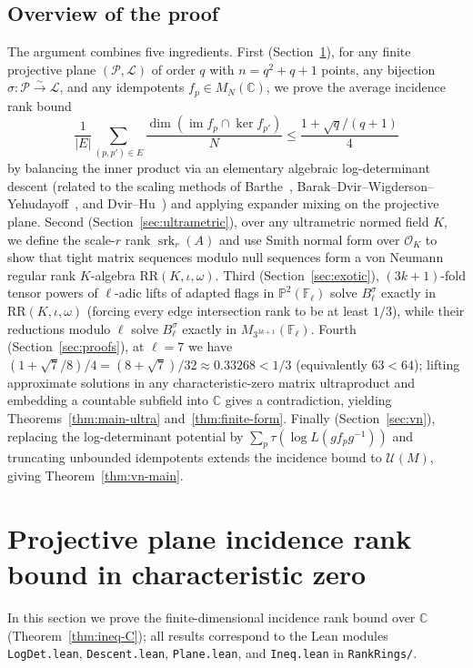 \documentclass[11pt]{article}
\theoremstyle{definition}
\theoremstyle{remark}
\numberwithin{equation}{section}
\DeclareMathOperator{\srk}{srk}
\DeclareMathOperator{\im}{im}
\newcommand{\RR}{\mathrm{RR}}
\newcommand{\C}{\mathbb{C}}
\newcommand{\F}{\mathbb{F}}
\newcommand{\U}{\mathcal{U}}
\newcommand{\PP}{\mathcal{P}}
\newcommand{\LL}{\mathcal{L}}
\newcommand{\OO}{\mathcal{O}}
\newcommand{\1}{\mathbf{1}}
\newcommand{\code}[1]{{\normalfont\small\texttt{#1}}}
\begin{document}
\subsection{Overview of the proof}

The argument combines five ingredients. First (Section~\ref{sec:ineq}), for any finite projective plane $(\PP,\LL)$ of order $q$ with $n = q^2+q+1$ points, any bijection $\sigma\colon \PP \xrightarrow{\sim} \LL$, and any idempotents $f_p \in M_N(\C)$, we prove the average incidence rank bound
\[
\frac{1}{|E|}\sum_{(p,p') \in E} \frac{\dim(\im f_p \cap \ker f_{p'})}{N} \le \frac{1 + \sqrt{q}/(q+1)}{4}
\]
by balancing the inner product via an elementary algebraic log-determinant descent (related to the scaling methods of Barthe~\cite{Barthe1998}, Barak--Dvir--Wigderson--Yehudayoff~\cite{BDWY2011}, and Dvir--Hu~\cite{DvirHu2016}) and applying expander mixing on the projective plane. Second (Section~\ref{sec:ultrametric}), over any ultrametric normed field $K$, we define the scale-$r$ rank $\srk_r(A)$ and use Smith normal form over $\OO_K$ to show that tight matrix sequences modulo null sequences form a von Neumann regular rank $K$-algebra $\RR(K, \iota, \omega)$. Third (Section~\ref{sec:exotic}), $(3k+1)$-fold tensor powers of $\ell$-adic lifts of adapted flags in $\mathbb{P}^2(\F_\ell)$ solve $B_\ell^\sigma$ exactly in $\RR(K, \iota, \omega)$ (forcing every edge intersection rank to be at least $1/3$), while their reductions modulo $\ell$ solve $B_\ell^\sigma$ exactly in $M_{3^{3k+1}}(\F_\ell)$. Fourth (Section~\ref{sec:proofs}), at $\ell = 7$ we have $(1 + \sqrt{7}/8)/4 = (8+\sqrt{7})/32 \approx 0.33268 < 1/3$ (equivalently $63 < 64$); lifting approximate solutions in any characteristic-zero matrix ultraproduct and embedding a countable subfield into $\C$ gives a contradiction, yielding Theorems~\ref{thm:main-ultra} and~\ref{thm:finite-form}. Finally (Section~\ref{sec:vn}), replacing the log-determinant potential by $\sum_p \tau(\log L(g f_p g^{-1}))$ and truncating unbounded idempotents extends the incidence bound to $\U(M)$, giving Theorem~\ref{thm:vn-main}.

\section{Projective plane incidence rank bound in characteristic zero}
\label{sec:ineq}

In this section we prove the finite-dimensional incidence rank bound over $\C$ (Theorem~\ref{thm:ineq-C}); all results correspond to the Lean modules \code{LogDet.lean}, \code{Descent.lean}, \code{Plane.lean}, and \code{Ineq.lean} in \code{RankRings/}.
\end{document}
